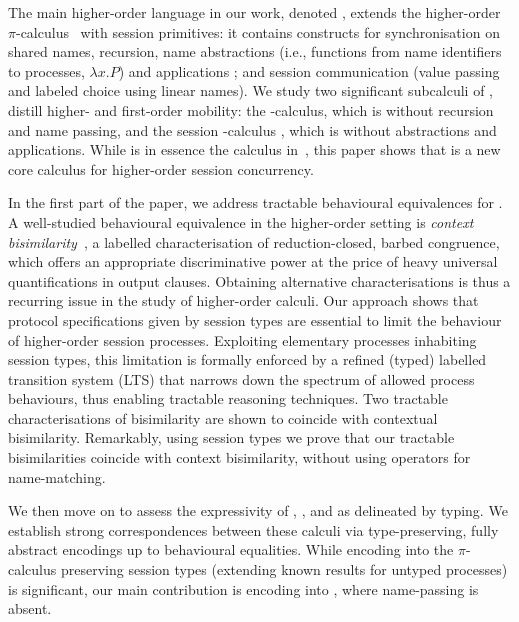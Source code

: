 The main higher-order language in our work, denoted \HOp,
extends the higher-order $\pi$-calculus~\cite{SangiorgiD:expmpa} with session primitives:
it contains constructs for 
synchronisation on shared names, 
recursion, 
name abstractions (i.e., functions from name identifiers  to processes, 
$\lambda x.P$) and applications 
;
and session communication (value passing and
labeled choice using linear names). 
We study two significant subcalculi of \HOp, 
distill higher- and first-order mobility:
the \HO-calculus, which is \HOp without recursion and name passing, and 
the session \sessp-calculus , which is \HOp without abstractions and applications.  
While \sessp is 
in essence the calculus in~\cite{honda.vasconcelos.kubo:language-primitives}, 
this paper shows that \HO  is a new core calculus 
for higher-order session concurrency.

In the first part of the paper, we address tractable behavioural equivalences
for \HOp.
A well-studied behavioural equivalence in the higher-order setting 
is \emph{context bisimilarity}~\cite{San96H},
a labelled characterisation of reduction-closed, barbed congruence, 
which offers an appropriate discriminative power at the price of heavy universal quantifications in output clauses.
Obtaining alternative characterisations 
is thus a recurring issue 
in the study of higher-order calculi. 
Our approach 
shows that protocol specifications given by session types are 
essential to  limit 
the behaviour of higher-order session processes. 
Exploiting elementary processes inhabiting session types, 
this limitation is formally enforced by 
a refined (typed) labelled transition system (LTS)
that narrows down the spectrum of allowed process behaviours, 
thus enabling tractable reasoning techniques. 
Two tractable characterisations of bisimilarity 
are shown to coincide with contextual bisimilarity.
Remarkably, using session types we prove that our tractable
bisimilarities coincide with context bisimilarity, without using
operators for 
name-matching.

We then move on to 
assess the expressivity 
 of \HOp, \HO, and \sessp as delineated by typing. 
We establish strong correspondences between 
these calculi  via type-preserving, fully abstract encodings up to 
behavioural equalities. While encoding \HOp 
into the $\pi$-calculus preserving session types 
(extending  known  results for untyped processes) is 
significant, 
our main contribution is 
encoding \HOp into \HO, where name-passing is absent.  

